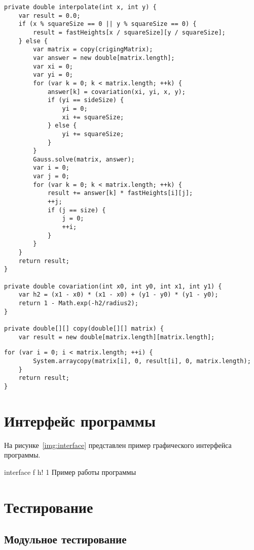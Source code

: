 \begin{lstlisting}[label=lst:gen3,caption=Реализация алгоритма генерации ландшафта (продолжение)]
private double interpolate(int x, int y) {
	var result = 0.0;
	if (x % squareSize == 0 || y % squareSize == 0) {
		result = fastHeights[x / squareSize][y / squareSize];
	} else {
		var matrix = copy(crigingMatrix);
		var answer = new double[matrix.length];
		var xi = 0;
		var yi = 0;
		for (var k = 0; k < matrix.length; ++k) {
			answer[k] = covariation(xi, yi, x, y);
			if (yi == sideSize) {
				yi = 0;
				xi += squareSize;
			} else {
				yi += squareSize;
			}
		}
		Gauss.solve(matrix, answer);
		var i = 0;
		var j = 0;
		for (var k = 0; k < matrix.length; ++k) {
			result += answer[k] * fastHeights[i][j];
			++j;
			if (j == size) {
				j = 0;
				++i;
			}
		}
	}
	return result;
}

private double covariation(int x0, int y0, int x1, int y1) {
	var h2 = (x1 - x0) * (x1 - x0) + (y1 - y0) * (y1 - y0);
	return 1 - Math.exp(-h2/radius2);
}

private double[][] copy(double[][] matrix) {
	var result = new double[matrix.length][matrix.length];
\end{lstlisting}

\begin{lstlisting}[label=lst:gen4,caption=Реализация алгоритма генерации ландшафта (окончание)]
		for (var i = 0; i < matrix.length; ++i) {
		System.arraycopy(matrix[i], 0, result[i], 0, matrix.length);
	}
	return result;
}
\end{lstlisting}

\section{Интерфейс программы}

На рисунке~\ref{img:interface} представлен пример графического интерфейса программы.

\FloatBarrier
{}
{interface} %
{f} %
{h!} %
{1\textwidth} %
{Пример работы программы} %
\FloatBarrier

\section{Тестирование}

\subsection{Модульное тестирование}

